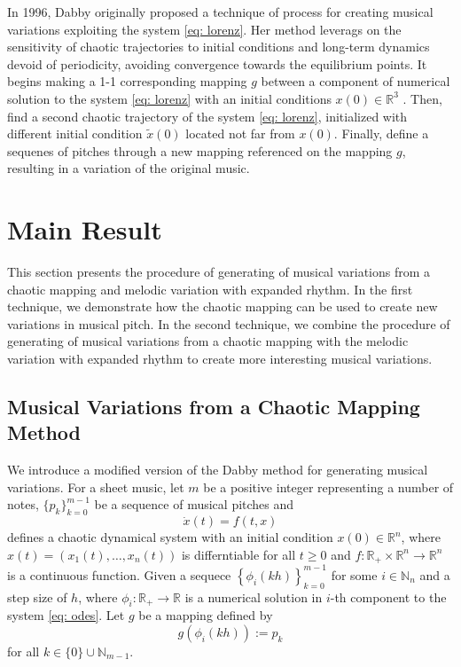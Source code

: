 \documentclass[11pt]{article}
\theoremstyle{definition}
\begin{document}
In 1996, Dabby \cite{dabby_musical_1996} originally proposed a technique of process for creating musical variations exploiting the system \eqref{eq: lorenz}. Her method leverags on the sensitivity of chaotic trajectories to initial conditions and long-term dynamics devoid of periodicity, avoiding convergence towards the equilibrium points. It begins making a 1-1 corresponding mapping $g$ between a component of numerical solution to the system \eqref{eq: lorenz} with an initial conditions $x(0) \in \mathbb{R}^3$ . Then, find a second chaotic trajectory of the system \eqref{eq: lorenz}, initialized with different initial condition $\tilde{x}(0)$ located not far from $x(0)$. Finally, define a sequenes of pitches through a new mapping referenced on the mapping $g$, resulting in a variation of the original music.

\section{Main Result}
\label{sec: mainresult}
This section presents the procedure of generating of musical variations from a chaotic mapping and melodic variation with expanded rhythm. In the first technique, we demonstrate how the chaotic mapping can be used to create new variations in musical pitch. In the second technique, we combine the procedure of generating of musical variations from a chaotic mapping with the melodic variation with expanded rhythm to create more interesting musical variations.

\subsection{Musical Variations from a Chaotic Mapping Method}
\label{ss: mvfacm}
We introduce a modified version of the Dabby method \cite{dabby_musical_1996} for generating musical variations.
For a sheet music, let $m$ be a positive integer representing a number of notes, $\{p_k\}_{k=0}^{m-1}$ be a sequence of musical pitches and    
\begin{equation} \label{eq: odes}
\dot{x}(t) = f(t,x)
\end{equation}
defines a chaotic dynamical system with an initial condition $x(0) \in \mathbb{R}^n$, where $x(t) = \left(x_1(t), \ldots, x_n(t)\right)$ is differntiable for all $t \geq 0$ and $f: \mathbb{R}_{+} \times \mathbb{R}^n \to \mathbb{R}^n$ is a continuous function. 
Given a sequece
$ \displaystyle\left\{\phi_i(kh) \right\}_{k=0}^{m-1}$ 
for some $i \in \mathbb{N}_n$ and a step size of $h$, where $\phi_i:\mathbb{R}_+ \to \mathbb{R}$ is a numerical solution in $i$-th component to the system \eqref{eq: odes}. Let $g$ be a mapping defined by 
\begin{equation} \label{eq: gmap}
g(\phi_i(kh)) := p_k
\end{equation}
for all $k \in \{0\}\cup\mathbb{N}_{m-1}$.
\end{document}
